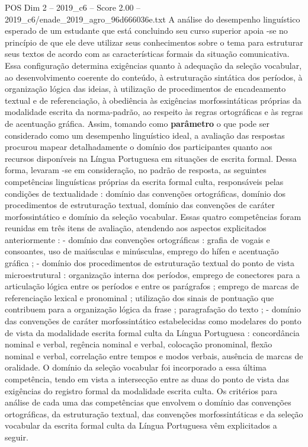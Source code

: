 \begin{textsample}{POS Dim 2 – 2019\_c6 – Score 2.00 – 2019\_c6/enade\_2019\_agro\_96d666036e.txt}
A análise do desempenho linguístico esperado de um estudante que está concluindo seu curso superior apoia -se no princípio de que ele deve utilizar seus conhecimentos sobre o tema para estruturar seus textos de acordo com as características formais da situação comunicativa.
Essa configuração determina exigências quanto à adequação da seleção vocabular, ao desenvolvimento coerente do conteúdo, à estruturação sintática dos períodos, à organização lógica das ideias, à utilização de procedimentos de encadeamento textual e de referenciação, à obediência às exigências morfossintáticas próprias da modalidade escrita da norma-padrão, ao respeito às regras ortográficas e às regras de acentuação gráfica.
Assim, tomando como \textbf{parâmetro} o que pode ser considerado como um desempenho linguístico ideal, a avaliação das respostas procurou mapear detalhadamente o domínio dos participantes quanto aos recursos disponíveis na Língua Portuguesa em situações de escrita formal.
Dessa forma, levaram -se em consideração, no padrão de resposta, as seguintes competências linguísticas próprias da escrita formal culta, responsáveis pelas condições de textualidade : domínio das convenções ortográficas, domínio dos procedimentos de estruturação textual, domínio das convenções de caráter morfossintático e domínio da seleção vocabular.
Essas quatro competências foram reunidas em três itens de avaliação, atendendo aos aspectos explicitados anteriormente : - domínio das convenções ortográficas : grafia de vogais e consoantes, uso de maiúsculas e minúsculas, emprego do hífen e acentuação gráfica ; - domínio dos procedimentos de estruturação textual do ponto de vista microestrutural : organização interna dos períodos, emprego de conectores para a articulação lógica entre os períodos e entre os parágrafos ; emprego de marcas de referenciação lexical e pronominal ; utilização dos sinais de pontuação que contribuem para a organização lógica da frase ; paragrafação do texto ; - domínio das convenções de caráter morfossintático estabelecidas como modelares do ponto de vista da modalidade escrita formal culta da Língua Portuguesa : concordância nominal e verbal, regência nominal e verbal, colocação pronominal, flexão nominal e verbal, correlação entre tempos e modos verbais, ausência de marcas de oralidade.
O domínio da seleção vocabular foi incorporado a essa última competência, tendo em vista a intersecção entre as duas do ponto de vista das exigências do registro formal da modalidade escrita culta.
Os critérios para análise de cada uma das competências que envolvem o domínio das convenções ortográficas, da estruturação textual, das convenções morfossintáticas e da seleção vocabular da escrita formal culta da Língua Portuguesa vêm explicitados a seguir.

\end{textsample}
